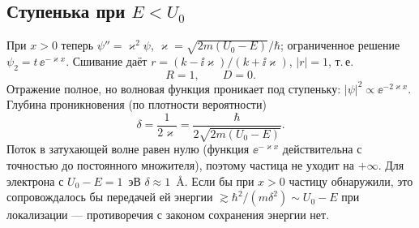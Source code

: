 \subsection{Ступенька при $E<U_0$}

При $x>0$ теперь $\psi''=\varkappa^2\psi$, $\varkappa=\sqrt{2m(U_0-E)}/\hbar$; ограниченное решение
$\psi_2=t\,\ee^{-\varkappa x}$. Сшивание даёт $r=(k-\ii\varkappa)/(k+\ii\varkappa)$, $|r|=1$, т.\,е.
\begin{equation}
  R=1,\qquad D=0 .
\end{equation}
Отражение полное, но волновая функция проникает под ступеньку: $|\psi|^2\propto\ee^{-2\varkappa x}$.
Глубина проникновения (по плотности вероятности)
\begin{equation}\label{eq:7:depth}
  \delta=\frac{1}{2\varkappa}=\frac{\hbar}{2\sqrt{2m(U_0-E)}} .
\end{equation}
Поток в затухающей волне равен нулю (функция $\ee^{-\varkappa x}$ действительна с точностью до постоянного
множителя), поэтому частица не уходит на $+\infty$. Для электрона с $U_0-E=1$~эВ $\delta\approx1$~Å.
Если бы при $x>0$ частицу обнаружили, это сопровождалось бы передачей ей энергии
$\gtrsim\hbar^2/(m\delta^2)\sim U_0-E$ при локализации — противоречия с законом сохранения энергии нет.

